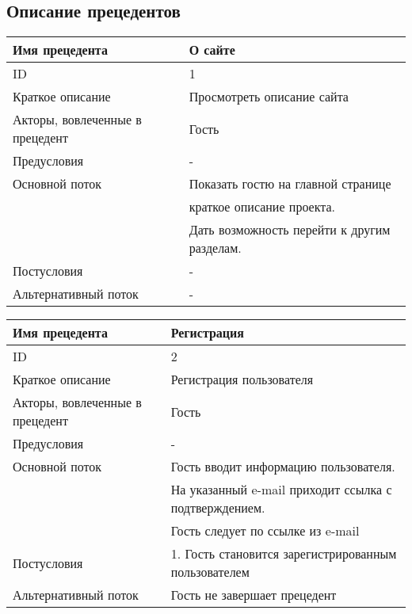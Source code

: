 \subsection{Описание прецедентов}

\noindent
\begin{tabular}{|l|l|}
    \hline Имя прецедента                  & О сайте \\
    \hline ID                              & 1 \\
    \hline Краткое описание                & Просмотреть описание сайта \\
    \hline Акторы, вовлеченные в прецедент & Гость \\
    \hline Предусловия                     & - \\
    \hline Основной поток                  & Показать гостю на главной странице \\
                                           & краткое описание проекта. \\
                                           & Дать возможность перейти к другим разделам. \\
    \hline Постусловия                     & - \\
    \hline Альтернативный поток            & - \\
    \hline
\end{tabular}

\bigskip\noindent
\begin{tabular}{|l|l|}
    \hline Имя прецедента                  & Регистрация \\
    \hline ID                              & 2 \\
    \hline Краткое описание                & Регистрация пользователя \\
    \hline Акторы, вовлеченные в прецедент & Гость \\
    \hline Предусловия                     & - \\
    \hline Основной поток                  & Гость вводит информацию пользователя. \\
                                           & На указанный e-mail приходит ссылка с подтверждением. \\
                                           & Гость следует по ссылке из e-mail \\
    \hline Постусловия                     & 1. Гость становится зарегистрированным пользователем \\
    \hline Альтернативный поток            & Гость не завершает прецедент \\
    \hline
\end{tabular}

